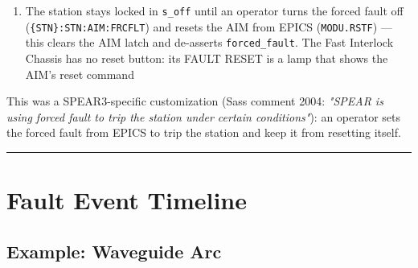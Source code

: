 \begin{enumerate}
\def\labelenumi{\arabic{enumi}.}
\setcounter{enumi}{2}
\tightlist
\item
  The station stays locked in \texttt{s\_off} until an operator turns the forced fault off (\texttt{\{STN\}:\allowbreak{}STN:\allowbreak{}AIM:\allowbreak{}FRCFLT}) and resets the AIM from EPICS (\texttt{MODU.RSTF}) --- this clears the AIM latch and de-asserts \texttt{forced\_fault}. The Fast Interlock Chassis has no reset button: its FAULT RESET is a lamp that shows the AIM's reset command 
\end{enumerate}

This was a SPEAR3-specific customization (Sass comment 2004: \emph{"SPEAR is using forced fault to trip the station under certain conditions"}): an operator sets the forced fault from EPICS to trip the station and keep it from resetting itself.

\begin{center}\rule{0.5\linewidth}{0.5pt}\end{center}

\section{Fault Event Timeline}\label{sec:timelines}


\subsection{Example: Waveguide Arc}\label{sec:tl-arc}


